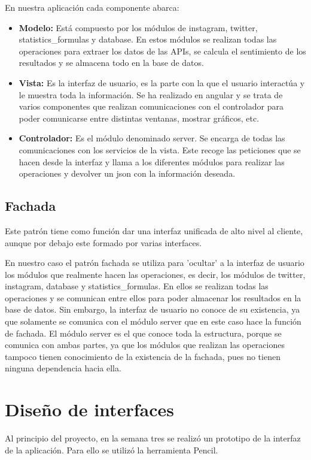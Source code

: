 En nuestra aplicación cada componente abarca:
\begin{itemize}\tightlist
    \item \textbf{Modelo:} Está compuesto por los módulos de instagram, twitter, statistics\_formulas y database. En estos módulos se realizan todas las operaciones para extraer los datos de las APIs, se calcula el sentimiento de los resultados y se almacena todo en la base de datos.
    \item \textbf{Vista:} Es la interfaz de usuario, es la parte con la que el usuario interactúa y le muestra toda la información. Se ha realizado en angular y se trata de varios componentes que realizan comunicaciones con el controlador para poder comunicarse entre distintas ventanas, mostrar gráficos, etc.
    \item\textbf{Controlador:} Es el módulo denominado server. Se encarga de todas las comunicaciones con los servicios de la vista. Este recoge las peticiones que se hacen desde la interfaz y llama a los diferentes módulos para realizar las operaciones y devolver un json con la información deseada.
\end{itemize}


\subsection{Fachada}
Este patrón tiene como función dar una interfaz unificada de alto nivel al cliente, aunque por debajo este formado por varias interfaces. \cite{patronFachada}

En nuestro caso el patrón fachada se utiliza para 'ocultar' a la interfaz de usuario los módulos que realmente hacen las operaciones, es decir, los módulos de twitter, instagram, database y statistics\_formulas. En ellos se realizan todas las operaciones y se comunican entre ellos para poder almacenar los resultados en la base de datos. Sin embargo, la interfaz de usuario no conoce de su existencia, ya que solamente se comunica con el módulo server que en este caso hace la función de fachada. El módulo server es el que conoce toda la estructura, porque se comunica con ambas partes, ya que los módulos que realizan las operaciones tampoco tienen conocimiento de la existencia de la fachada, pues no tienen ninguna dependencia hacia ella. 


\clearpage
\section{Diseño de interfaces}
Al principio del proyecto, en la semana tres se realizó un prototipo de la interfaz de la aplicación. Para ello se utilizó la herramienta Pencil.

